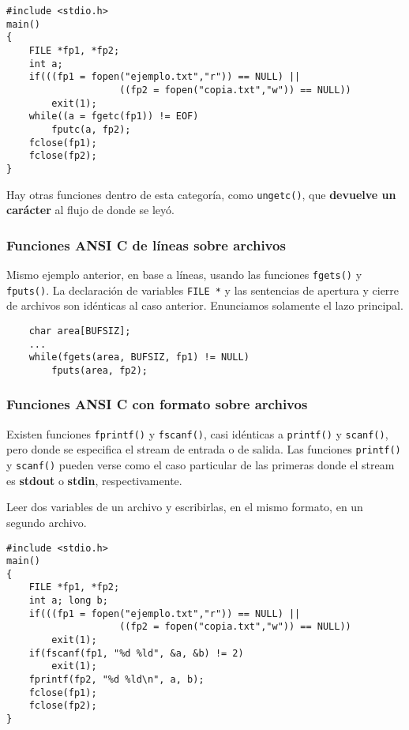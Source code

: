 \begin{lstlisting}
#include <stdio.h>
main()
{
    FILE *fp1, *fp2;
    int a;
    if(((fp1 = fopen("ejemplo.txt","r")) == NULL) ||
                    ((fp2 = fopen("copia.txt","w")) == NULL))
        exit(1);
    while((a = fgetc(fp1)) != EOF)
        fputc(a, fp2);
    fclose(fp1);
    fclose(fp2);
}
\end{lstlisting}

Hay otras funciones dentro de esta categoría, como \lstinline{ungetc()}, que \textbf{devuelve un
carácter} al flujo de donde se leyó.

\subsubsection{Funciones ANSI C de líneas sobre archivos}
\label{subsubsec:esarchivosansiclineas}
Mismo ejemplo anterior, en base a líneas, usando las funciones \lstinline{fgets()} y \lstinline{fputs()}. La
declaración de variables \lstinline{FILE *} y las sentencias de apertura y cierre de
archivos son idénticas al caso anterior. Enunciamos solamente el lazo
principal.
    
\begin{lstlisting}
    char area[BUFSIZ];
    ...
    while(fgets(area, BUFSIZ, fp1) != NULL)
        fputs(area, fp2);
\end{lstlisting}

\subsubsection{Funciones ANSI C con formato sobre archivos}
\label{subsubsec:esarchivosansicformato}

Existen funciones \lstinline{fprintf()} y \lstinline{fscanf()}, casi idénticas a \lstinline{printf()} y \lstinline{scanf()},
pero donde se especifica el stream de entrada o de salida. Las funciones \lstinline{printf()} y \lstinline{scanf()} pueden verse como el caso particular de las primeras donde el
stream es \textbf{stdout} o \textbf{stdin}, respectivamente.

\begin{ejemplo}
Leer dos variables de un archivo y escribirlas, en el
mismo formato, en un segundo archivo.
\begin{lstlisting}
#include <stdio.h>
main()
{
    FILE *fp1, *fp2;
    int a; long b;
    if(((fp1 = fopen("ejemplo.txt","r")) == NULL) ||
                    ((fp2 = fopen("copia.txt","w")) == NULL))
        exit(1);
    if(fscanf(fp1, "%d %ld", &a, &b) != 2)
        exit(1);
    fprintf(fp2, "%d %ld\n", a, b);
    fclose(fp1);
    fclose(fp2);
}
\end{lstlisting}
\end{ejemplo}




